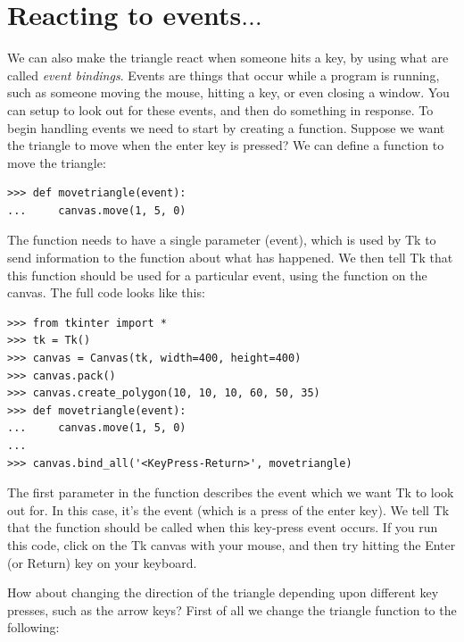 \section{Reacting to events$\ldots$}

We can also make the triangle react when someone hits a key, by using what are called \emph{event bindings}.  Events are things that occur while a program is running, such as someone moving the mouse, hitting a key, or even closing a window. You can setup  to look out for these events, and then do something in response. To begin handling events we need to start by creating a function. Suppose we want the triangle to move when the enter key is pressed? We can define a function to move the triangle:

\begin{listing}
\begin{verbatim}
>>> def movetriangle(event):
...     canvas.move(1, 5, 0)
\end{verbatim}
\end{listing}

The function needs to have a single parameter (event), which is used by Tk to send information to the function about what has happened.  We then tell Tk that this function should be used for a particular event, using the  function on the canvas. The full code looks like this:

\begin{listing}
\begin{verbatim}
>>> from tkinter import *
>>> tk = Tk()
>>> canvas = Canvas(tk, width=400, height=400)
>>> canvas.pack()
>>> canvas.create_polygon(10, 10, 10, 60, 50, 35)
>>> def movetriangle(event):
...     canvas.move(1, 5, 0)
...
>>> canvas.bind_all('<KeyPress-Return>', movetriangle)
\end{verbatim}
\end{listing}

The first parameter in the  function describes the event which we want Tk to look out for. In this case, it's the event  (which is a press of the enter key).  We tell Tk that the  function should be called when this key-press event occurs.  If you run this code, click on the Tk canvas with your mouse, and then try hitting the Enter (or Return) key on your keyboard.

How about changing the direction of the triangle depending upon different key presses, such as the arrow keys? First of all we change the  triangle function to the following:

